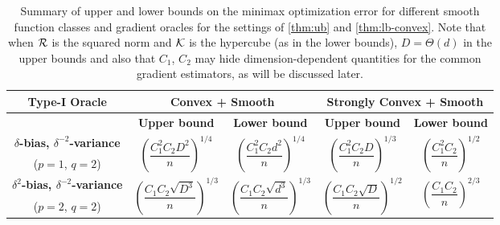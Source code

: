 \begin{table*}
\small
\centering
 \begin{tabular}{|c|c|c|c|c|}
\toprule
  \multirow{2}{*}{\textbf{Type-I Oracle}} & \multicolumn{2}{c}{\multirow{2}{*}{\textbf{Convex + Smooth}}} & \multicolumn{2}{|c|}{\multirow{2}{*}{\textbf{Strongly Convex + Smooth}}} \\[1em]
 \midrule
 & \textbf{Upper bound} & \textbf{Lower bound} & \textbf{Upper bound} & \textbf{Lower bound}\\
 \midrule
\textbf{ $\delta$-bias, $\delta^{-2}$-variance} & \multirow{2}{*}{$\left(\dfrac{C_1^{2}C_2 D^2}{n}\right)^{1/4}$}  & \multirow{2}{*}{$\left(\dfrac{C_1^2 C_2 d^2}{n}\right)^{1/4}$}& \multirow{2}{*}{$\left(\dfrac{C_1^2 C_2 D}{n}\right)^{1/3}$}  & \multirow{2}{*}{$\left(\dfrac{C_1^2 C_2}{ n}\right)^{1/2}$} \\[0.5ex]
 ($p=1$, $q=2$) & & & &\\\midrule
\textbf{$\delta^2$-bias, $\delta^{-2}$-variance } & \multirow{2}{*}{$\left(\dfrac{C_1 C_2 \sqrt{D^3}}{n}\right)^{1/3}$}  & \multirow{2}{*}{$\left(\dfrac{C_1 C_2 \sqrt{d^3}}{n}\right)^{1/3}$} & \multirow{2}{*}{$\left(\dfrac{C_1 C_2\sqrt{D}}{n}\right)^{1/2}$}  & \multirow{2}{*}{$\left(\dfrac{C_1 C_2 }{ n}\right)^{2/3}$}\\[1.4ex]
 ($p=2$, $q=2$) & & & &\\
\bottomrule
\end{tabular}
\caption{Summary of upper and lower bounds on the minimax optimization error for different smooth function classes and  gradient oracles for the settings of \cref{thm:ub} and \cref{thm:lb-convex}. Note that when $\mathcal{R}$ is the squared norm and $\mathcal{K}$ is the hypercube (as in the lower bounds), $D=\Theta(d)$ in the upper bounds and also that $C_1$, $C_2$ may hide dimension-dependent quantities for the common gradient estimators, as will be discussed later.
}
\label{tab:mse-1}
\end{table*}


